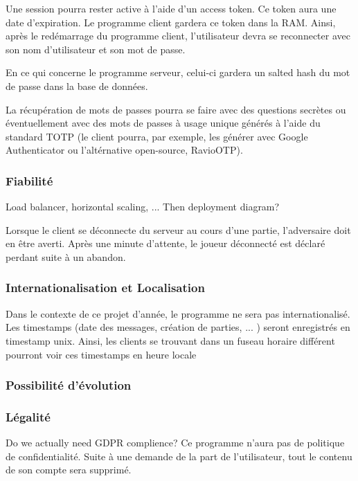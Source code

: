 \documentclass[french, utf8]{article}
\begin{document}
Une session pourra rester active à l'aide d'un access token.
Ce token aura une date d'expiration. Le programme client gardera ce token dans la RAM.
Ainsi, après le redémarrage du programme client, l'utilisateur devra se reconnecter avec son nom d'utilisateur et son mot de passe.


En ce qui concerne le programme serveur, celui-ci gardera un salted hash du mot de passe dans la base de données.

La récupération de mots de passes pourra se faire avec des questions secrètes ou éventuellement avec des mots de passes à usage unique générés à l'aide du standard TOTP (le client pourra, par exemple, les générer avec Google Authenticator ou l'altérnative open-source, RavioOTP).

\subsubsection{Fiabilité}

Load balancer, horizontal scaling, ... Then deployment diagram?

Lorsque le client se déconnecte du serveur au cours d'une partie, l'adversaire doit en être averti.
Après une minute d'attente, le joueur déconnecté est déclaré perdant suite à un abandon.

\subsubsection{Internationalisation et Localisation}

Dans le contexte de ce projet d'année, le programme ne sera pas internationalisé.
Les timestamps (date des messages, création de parties, ... ) seront enregistrés en timestamp unix. Ainsi, les clients se trouvant dans un fuseau horaire différent pourront voir ces timestamps en heure locale

\subsubsection{Possibilité d'évolution}


\subsubsection{Légalité}


Do we actually need GDPR complience?
Ce programme n'aura pas de politique de confidentialité.
Suite à une demande de la part de l'utilisateur, tout le contenu de son compte sera supprimé.
\end{document}
